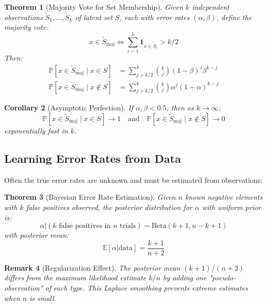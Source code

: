 \documentclass[11pt,final,hidelinks]{article}
\newtheorem{theorem}{Theorem}[section]
\newtheorem{corollary}[theorem]{Corollary}
\newtheorem{remark}[theorem]{Remark}
\newcommand{\obs}[1]{\widetilde{#1}}  %
\newcommand{\ProbCond}[2]{\mathbb{P}\left[#1 \mid #2\right]}
\newcommand{\Expect}[1]{\mathbb{E}\left[#1\right]}
\newcommand{\fprate}{\alpha}
\newcommand{\fnrate}{\beta}
\begin{document}
\begin{theorem}[Majority Vote for Set Membership]
Given $k$ independent observations $\obs{S}_1, \ldots, \obs{S}_k$ of latent set $S$, each with error rates $(\fprate, \fnrate)$, define the majority vote:
\begin{equation}
x \in \obs{S}_{\text{maj}} \iff \sum_{i=1}^k \mathbf{1}_{x \in \obs{S}_i} > k/2
\end{equation}
Then:
\begin{align}
\ProbCond{x \in \obs{S}_{\text{maj}}}{x \in S} &= \sum_{j > k/2}^k \binom{k}{j} (1-\fnrate)^j \fnrate^{k-j} \\
\ProbCond{x \in \obs{S}_{\text{maj}}}{x \notin S} &= \sum_{j > k/2}^k \binom{k}{j} \fprate^j (1-\fprate)^{k-j}
\end{align}
\end{theorem}

\begin{corollary}[Asymptotic Perfection]
If $\fprate, \fnrate < 0.5$, then as $k \to \infty$:
\begin{equation}
\ProbCond{x \in \obs{S}_{\text{maj}}}{x \in S} \to 1 \quad \text{and} \quad \ProbCond{x \in \obs{S}_{\text{maj}}}{x \notin S} \to 0
\end{equation}
exponentially fast in $k$.
\end{corollary}

\subsection{Learning Error Rates from Data}

Often the true error rates are unknown and must be estimated from observations:

\begin{theorem}[Bayesian Error Rate Estimation]
Given $n$ known negative elements with $k$ false positives observed, the posterior distribution for $\fprate$ with uniform prior is:
\begin{equation}
\fprate | (k \text{ false positives in } n \text{ trials}) \sim \text{Beta}(k+1, n-k+1)
\end{equation}
with posterior mean:
\begin{equation}
\Expect{\fprate | \text{data}} = \frac{k+1}{n+2}
\end{equation}
\end{theorem}

\begin{remark}[Regularization Effect]
The posterior mean $(k+1)/(n+2)$ differs from the maximum likelihood estimate $k/n$ by adding one "pseudo-observation" of each type. This Laplace smoothing prevents extreme estimates when $n$ is small.
\end{remark}
\end{document}

